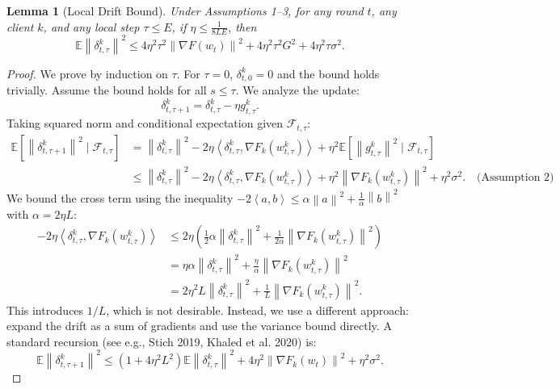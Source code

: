 \documentclass{article}
\newtheorem{lemma}{Lemma}
\newcommand{\norm}[1]{\left\| #1 \right\|}
\newcommand{\inner}[2]{\left\langle #1, #2 \right\rangle}
\begin{document}
\begin{lemma}[Local Drift Bound]
\label{lemma:drift_bound}
Under Assumptions 1--3, for any round $t$, any client $k$, and any local step $\tau \le E$, if $\eta \le \frac{1}{8LE}$, then
\begin{equation}
    \mathbb{E} \norm{\delta_{t,\tau}^k}^2 \le 4\eta^2 \tau^2 \norm{\nabla F(w_t)}^2 + 4\eta^2 \tau^2 G^2 + 4\eta^2 \tau \sigma^2.
\end{equation}
\end{lemma}
\begin{proof}
We prove by induction on $\tau$. For $\tau=0$, $\delta_{t,0}^k=0$ and the bound holds trivially.
Assume the bound holds for all $s \le \tau$. We analyze the update:
\begin{equation}
    \delta_{t,\tau+1}^k = \delta_{t,\tau}^k - \eta g_{t,\tau}^k.
\end{equation}
Taking squared norm and conditional expectation given $\mathcal{F}_{t,\tau}$:
\begin{align}
\mathbb{E}[\norm{\delta_{t,\tau+1}^k}^2 \mid \mathcal{F}_{t,\tau}]
&= \norm{\delta_{t,\tau}^k}^2 - 2\eta \inner{\delta_{t,\tau}^k}{\nabla F_k(w_{t,\tau}^k)} + \eta^2 \mathbb{E}[\norm{g_{t,\tau}^k}^2 \mid \mathcal{F}_{t,\tau}] \\
&\le \norm{\delta_{t,\tau}^k}^2 - 2\eta \inner{\delta_{t,\tau}^k}{\nabla F_k(w_{t,\tau}^k)} + \eta^2 \norm{\nabla F_k(w_{t,\tau}^k)}^2 + \eta^2 \sigma^2. \quad \text{(Assumption 2)}
\end{align}
We bound the cross term using the inequality $-2\inner{a}{b} \le \alpha \norm{a}^2 + \frac{1}{\alpha}\norm{b}^2$ with $\alpha = 2\eta L$:
\begin{align}
-2\eta \inner{\delta_{t,\tau}^k}{\nabla F_k(w_{t,\tau}^k)} &\le 2\eta \left( \frac{1}{2} \alpha \norm{\delta_{t,\tau}^k}^2 + \frac{1}{2\alpha} \norm{\nabla F_k(w_{t,\tau}^k)}^2 \right) \\
&= \eta \alpha \norm{\delta_{t,\tau}^k}^2 + \frac{\eta}{\alpha} \norm{\nabla F_k(w_{t,\tau}^k)}^2 \\
&= 2\eta^2 L \norm{\delta_{t,\tau}^k}^2 + \frac{1}{L} \norm{\nabla F_k(w_{t,\tau}^k)}^2.
\end{align}
This introduces $1/L$, which is not desirable. Instead, we use a different approach: expand the drift as a sum of gradients and use the variance bound directly. A standard recursion (see e.g., Stich 2019, Khaled et al. 2020) is:
\begin{equation}
    \mathbb{E}\norm{\delta_{t,\tau+1}^k}^2 \le (1 + 4\eta^2 L^2) \mathbb{E}\norm{\delta_{t,\tau}^k}^2 + 4\eta^2 \norm{\nabla F_k(w_t)}^2 + \eta^2 \sigma^2. \tag{*}

\end{equation}
\end{proof}
\end{document}
